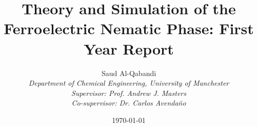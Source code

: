\documentclass[a4paper,12pt]{article}
\title{Theory and Simulation of the Ferroelectric Nematic Phase: First Year Report}
\author{Saud Al-Qabandi \\
    \textit{Department of Chemical Engineering, University of Manchester} \\
    \textit{Supervisor: Prof. Andrew J. Masters}\\
\textit{Co-supervisor: Dr. Carlos Avendaño}\\}
\date{\today}
\begin{document}
\maketitle
\pagebreak



   
\end{document}
